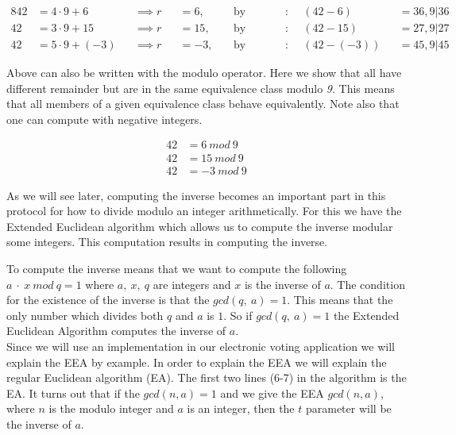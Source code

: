 \noindent
\begin{alignat*}{8}
42 &= 4 \cdot 9 +6 &&\implies r &&= 6 ,\ &&\text{by \ definition}: \  &&(42-6) &&= 36 ,  9| 36 \\
42 &= 3 \cdot 9 +15 &&\implies r &&= 15 ,\ &&\text{by \ definition}: \ &&(42-15) &&= 27 ,  9| 27 \\
42 &= 5 \cdot 9 +(-3) &&\implies r &&= -3 ,\ &&\text{by \ definition}: \ &&(42-(-3)) &&= 45 ,  9| 45 
\end{alignat*}




 Above can also be written with the modulo operator. Here we show that all have different remainder but are in the same equivalence class modulo \textit{9}. This means that all members of a given equivalence class behave equivalently. Note also that one can compute with negative integers.

\begin{align*}
42 &= 6 \ mod \ 9 \\
42 &= 15 \ mod \ 9 \\
42 &= -3 \ mod \ 9 
\end{align*}

As we will see later, computing the inverse becomes an important part in this protocol for how to divide modulo an integer arithmetically. For this we have the Extended Euclidean algorithm which allows us to compute the inverse modular some integers. This computation results in computing the inverse.


  To compute the inverse means that we want to compute the following \begin{math}a\ \cdot \ x \ mod \ q = 1 \end{math} where $a, \ x, \ q$ are integers and $x$ is the inverse of $a$. The condition for the existence of the inverse is that the $gcd(q,\ a)= 1$. This means that the only number which divides both $q$ and $a$ is $1$. So if $gcd(q,\ a)= 1$ the Extended Euclidean Algorithm computes the inverse of $a$.\\


 Since we will use an implementation in our electronic voting application we will explain the EEA by example. In order to explain the EEA we will explain the regular Euclidean algorithm (EA). The first two lines (6-7) in the algorithm is the EA. It turns out that if the $gcd(n,a)=1$  and we give the EEA $gcd(n,a)$, where $n$ is the modulo integer and $a$ is an integer, then the $t$ parameter will be the inverse of $a$. 
\cite{Paar}

